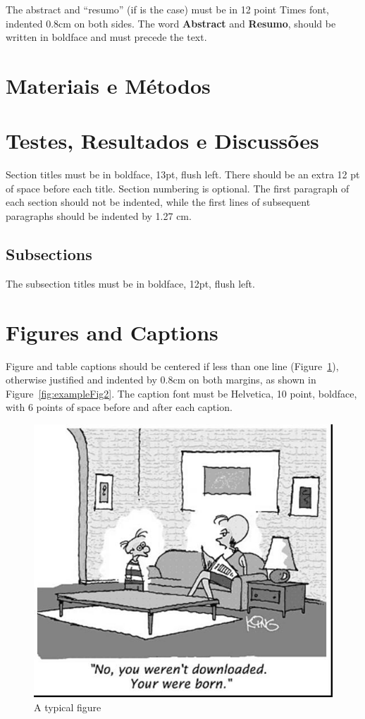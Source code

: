 \begin{document}
The abstract and ``resumo'' (if is the case) must be in 12 point Times font,
indented 0.8cm on both sides. The word \textbf{Abstract} and \textbf{Resumo},
should be written in boldface and must precede the text.

\section{Materiais e Métodos} \label{sec:mat_metodos}


\section{Testes, Resultados e Discussões} \label{sec:testes}

Section titles must be in boldface, 13pt, flush left. There should be an extra
12 pt of space before each title. Section numbering is optional. The first
paragraph of each section should not be indented, while the first lines of
subsequent paragraphs should be indented by 1.27 cm.

\subsection{Subsections}

The subsection titles must be in boldface, 12pt, flush left.

\section{Figures and Captions}\label{sec:figs}


Figure and table captions should be centered if less than one line
(Figure~\ref{fig:exampleFig1}), otherwise justified and indented by 0.8cm on
both margins, as shown in Figure~\ref{fig:exampleFig2}. The caption font must
be Helvetica, 10 point, boldface, with 6 points of space before and after each
caption.

\begin{figure}[ht]
\centering
\includegraphics[width=.5\textwidth]{fig1.jpg}
\caption{A typical figure}
\label{fig:exampleFig1}
\end{figure}
\end{document}
